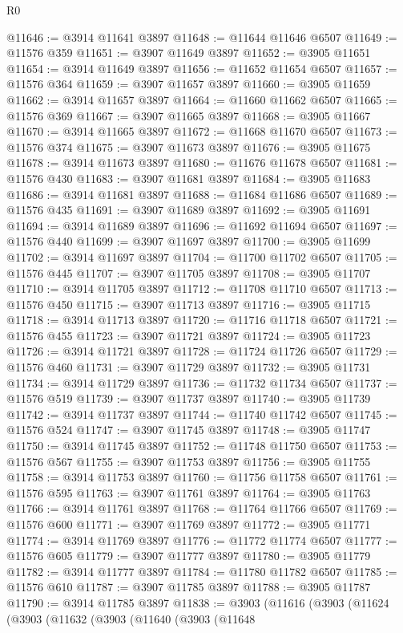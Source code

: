 \begin{lexlean}{R0}
\begin{coremodule}
@11646 := @3914 @11641 @3897
@11648 := @11644 @11646 @6507
@11649 := @11576 @359
@11651 := @3907 @11649 @3897
@11652 := @3905 @11651
@11654 := @3914 @11649 @3897
@11656 := @11652 @11654 @6507
@11657 := @11576 @364
@11659 := @3907 @11657 @3897
@11660 := @3905 @11659
@11662 := @3914 @11657 @3897
@11664 := @11660 @11662 @6507
@11665 := @11576 @369
@11667 := @3907 @11665 @3897
@11668 := @3905 @11667
@11670 := @3914 @11665 @3897
@11672 := @11668 @11670 @6507
@11673 := @11576 @374
@11675 := @3907 @11673 @3897
@11676 := @3905 @11675
@11678 := @3914 @11673 @3897
@11680 := @11676 @11678 @6507
@11681 := @11576 @430
@11683 := @3907 @11681 @3897
@11684 := @3905 @11683
@11686 := @3914 @11681 @3897
@11688 := @11684 @11686 @6507
@11689 := @11576 @435
@11691 := @3907 @11689 @3897
@11692 := @3905 @11691
@11694 := @3914 @11689 @3897
@11696 := @11692 @11694 @6507
@11697 := @11576 @440
@11699 := @3907 @11697 @3897
@11700 := @3905 @11699
@11702 := @3914 @11697 @3897
@11704 := @11700 @11702 @6507
@11705 := @11576 @445
@11707 := @3907 @11705 @3897
@11708 := @3905 @11707
@11710 := @3914 @11705 @3897
@11712 := @11708 @11710 @6507
@11713 := @11576 @450
@11715 := @3907 @11713 @3897
@11716 := @3905 @11715
@11718 := @3914 @11713 @3897
@11720 := @11716 @11718 @6507
@11721 := @11576 @455
@11723 := @3907 @11721 @3897
@11724 := @3905 @11723
@11726 := @3914 @11721 @3897
@11728 := @11724 @11726 @6507
@11729 := @11576 @460
@11731 := @3907 @11729 @3897
@11732 := @3905 @11731
@11734 := @3914 @11729 @3897
@11736 := @11732 @11734 @6507
@11737 := @11576 @519
@11739 := @3907 @11737 @3897
@11740 := @3905 @11739
@11742 := @3914 @11737 @3897
@11744 := @11740 @11742 @6507
@11745 := @11576 @524
@11747 := @3907 @11745 @3897
@11748 := @3905 @11747
@11750 := @3914 @11745 @3897
@11752 := @11748 @11750 @6507
@11753 := @11576 @567
@11755 := @3907 @11753 @3897
@11756 := @3905 @11755
@11758 := @3914 @11753 @3897
@11760 := @11756 @11758 @6507
@11761 := @11576 @595
@11763 := @3907 @11761 @3897
@11764 := @3905 @11763
@11766 := @3914 @11761 @3897
@11768 := @11764 @11766 @6507
@11769 := @11576 @600
@11771 := @3907 @11769 @3897
@11772 := @3905 @11771
@11774 := @3914 @11769 @3897
@11776 := @11772 @11774 @6507
@11777 := @11576 @605
@11779 := @3907 @11777 @3897
@11780 := @3905 @11779
@11782 := @3914 @11777 @3897
@11784 := @11780 @11782 @6507
@11785 := @11576 @610
@11787 := @3907 @11785 @3897
@11788 := @3905 @11787
@11790 := @3914 @11785 @3897
@11838 := @3903
    (@11616
      (@3903
        (@11624
          (@3903
            (@11632
              (@3903
                (@11640
                  (@3903
                    (@11648

\end{coremodule}
\end{lexlean}
